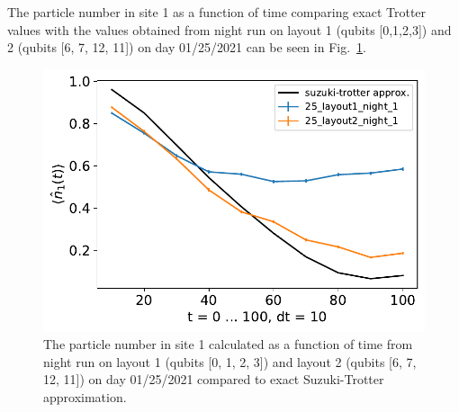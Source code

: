 The particle number in site 1 as a function of time comparing exact Trotter values with the values obtained from night run on layout 1 (qubits [0,1,2,3]) and 2 (qubits [6, 7, 12, 11]) on day 01/25/2021 can be seen in Fig.~\ref{fig:n1_Story5}.

\begin{figure}[H]
    \includegraphics[scale=0.55]{TIM_[25]_[layout1, layout2]_[night]_n1.pdf}
    \caption{The particle number in site 1 calculated as a function of time from night run on layout 1 (qubits [0, 1, 2, 3]) and layout 2 (qubits [6, 7, 12, 11]) on day 01/25/2021 compared to exact Suzuki-Trotter approximation.}
    \label{fig:n1_Story5}
\end{figure}

